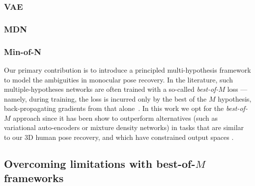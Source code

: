 



\subsubsection{VAE}
\subsubsection{MDN}
\subsubsection{Min-of-N}

Our primary contribution is to introduce a principled multi-hypothesis framework to model the ambiguities in monocular pose recovery.
In the literature, such multiple-hypotheses networks are often trained with a so-called \emph{best-of-$M$} loss --- namely, during training, the loss is incurred only by the best of the $M$ hypothesis, back-propagating gradients from that alone~\cite{guzman2012multiple}.
In this work we opt for the \emph{best-of-$M$} approach since it has been show to outperform  alternatives (such as variational auto-encoders or mixture density networks) in tasks that are similar to our 3D human pose recovery, and which have constrained output spaces \cite{rupprecht17learning}.



\subsection{Overcoming limitations with best-of-$M$ frameworks}

